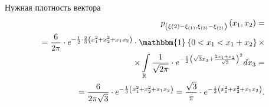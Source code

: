 \begin{enumerate}[label=\alph*)]
  Нужная плотность вектора
  \begin{equation*}
    \begin{split}
      p_{ \left( \xi{ \left( 2 \right) } - \xi_{ \left( 1 \right) }, \xi_{ \left( 3 \right) } - \xi_{ \left( 2 \right) } \right) }
        \left( x_1, x_2 \right) = \\
      = \frac{6}{2 \pi } \cdot e^{- \frac{1}{2} \cdot
      \frac{2}{3} \left( x_1^2 + x_2^2 + x_1 x_2 \right) } \cdot
      \mathbbm{1} \left\{ 0 < x_1 < x_1 + x_2 \right\} \times \\
      \times \int \limits_{ \mathbb{R}}
        \frac{1}{ \sqrt{2 \pi }} \cdot
        e^{- \frac{1}{2} \left( \sqrt{3} x_3 + \frac{2x_1 + x_2}{ \sqrt{3}} \right)^2}
      dx_3 = \\
      = \frac{6}{2 \pi \sqrt{3}} \cdot e^{- \frac{1}{3} \left( x_1^2 + x_2^2 + x_1 x_2 \right) } =
      \frac{ \sqrt{3}}{ \pi } \cdot e^{- \frac{1}{3} \left(x_1^2 + x_2^2 + x_1 x_2 \right) }.
    \end{split}
  \end{equation*}
\end{enumerate}

